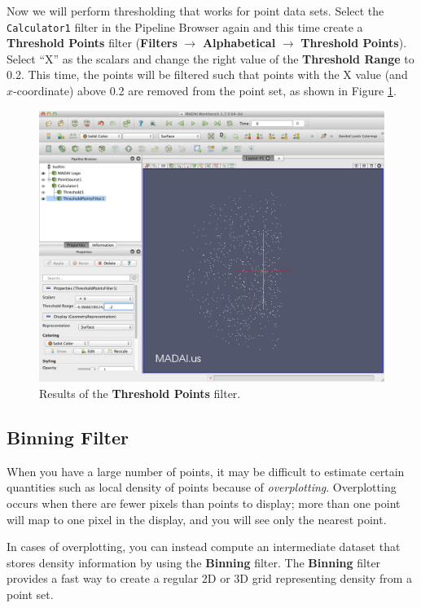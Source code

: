 \documentclass[12pt]{article}
\newcommand{\filter}[1]{\textbf{#1}}
\newcommand{\filterinstance}[1]{\texttt{#1}}
\newcommand{\menu}[1]{\textbf{#1}}
\newcommand{\setting}[1]{\textbf{#1}}
\begin{document}
Now we will perform thresholding that works for point data sets. Select the \filterinstance{Calculator1} filter in the Pipeline Browser again and this time create a \filter{Threshold Points} filter (\menu{Filters} $\rightarrow$ \menu{Alphabetical} $\rightarrow$ \menu{Threshold Points}). Select ``X'' as the scalars and change the right value of the \setting{Threshold Range} to 0.2. This time, the points will be filtered such that points with the X value (and $x$-coordinate) above 0.2 are removed from the point set, as shown in Figure \ref{fig:ThresholdPointsFilter}.

\begin{figure}[htbp]
   \centering
   \includegraphics[scale=.25]{images/ThresholdPointsFilter.png} %
   \caption{Results of the \filter{Threshold Points} filter.}
   \label{fig:ThresholdPointsFilter}
\end{figure}

\subsection{Binning Filter}

When you have a large number of points, it may be difficult to estimate certain quantities such as local density of points because of \emph{overplotting}. Overplotting occurs when there are fewer pixels than points to display; more than one point will map to one pixel in the display, and you will see only the nearest point.

In cases of overplotting, you can instead compute an intermediate dataset that stores density information by using the \filter{Binning} filter. The \filter{Binning} filter provides a fast way to create a regular 2D or 3D grid representing density from a point set.
\end{document}
